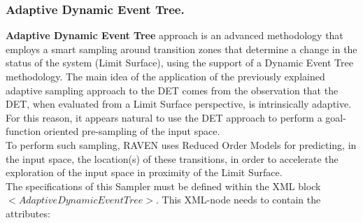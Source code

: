 \subsubsection{Adaptive Dynamic Event Tree.}
\label{subsubsubsec:ADET}
\textbf{Adaptive Dynamic Event Tree} approach is an advanced methodology that employs a smart sampling around transition zones that determine a change in the status of the system (Limit Surface), using the support of a Dynamic Event Tree methodology.
The main idea of the application of the previously explained adaptive sampling approach to the DET comes from the observation that the DET, when evaluated from a Limit Surface perspective, is intrinsically adaptive.
For this reason, it appears natural to use the DET approach to perform a goal-function oriented pre-sampling of the input space.
\\To perform such sampling, RAVEN uses Reduced Order Models for predicting, in the input space, the location(s) of these transitions, in order to accelerate the exploration of the input space in proximity of the Limit Surface.
\\ The specifications of this Sampler must be defined within the XML block $<AdaptiveDynamicEventTree>$. This XML-node needs to contain the attributes:
